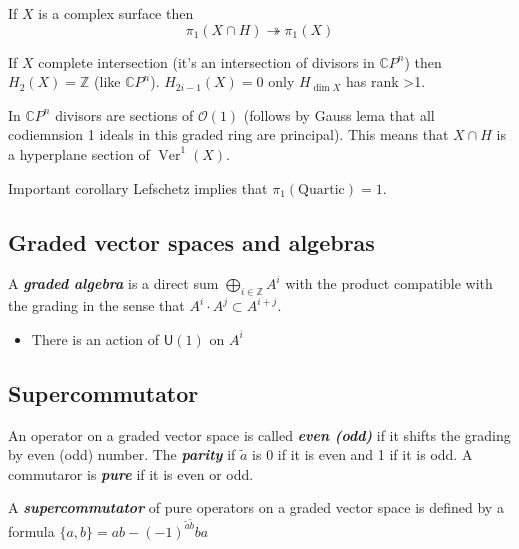\begin{coro}\leavevmode
If $X$ is a complex surface then
 \[\pi_{1}(X\cap H) \twoheadrightarrow \pi_{1}(X)\]
\end{coro}

\begin{coro}\leavevmode
	If $X$ complete intersection (it's an intersection of divisors in $\mathbb{C}P^{n}$) then $H_{2}(X) =\mathbb{Z}$ (like $\mathbb{C}P^{n}$). $H_{2i-1}(X)=0$ only $H_{\dim X}$ has rank >1.
\end{coro}

In $\mathbb{C}P^{n}$ divisors are sections of $\mathcal{O}(1)$ (follows by Gauss lema that all codiemnsion 1 ideals in this graded ring are principal). This means that $X\cap H$ is a hyperplane section of $ \operatorname{Ver}^1(X)$.

\begin{thing6}{Important corollary}\leavevmode
	Lefschetz implies that  $\pi_{1}(\text{Quartic} ) =1$.
\end{thing6}

\subsection{Graded vector spaces and algebras}

\begin{defn}\leavevmode
	A \textit{\textbf{graded algebra}} is a direct sum  $\bigoplus_{i \in\mathbb{Z}}A^i  $ with the product compatible with the grading in the sense that $A^i\cdot A^j\subset A^{i+j}$.
\end{defn}

\begin{itemize}
\item There is an action of $\mathsf{U}(1)$ on $A^i$
\end{itemize}

\subsection{Supercommutator}

\begin{defn}\leavevmode
	An operator on a graded vector space is called \textit{\textbf{even (odd)}} if it shifts the grading by even (odd) number. The  \textit{\textbf{parity}} if  $\tilde{a}$ is 0 if it is even and 1 if it is odd. A commutaror is \textit{\textbf{pure}} if it is even or odd.
\end{defn}

\begin{defn}\leavevmode
	A \textit{\textbf{supercommutator}} of pure operators on a graded vector space is defined by a formula $\{a,b\} =ab-(-1)^{\tilde{a}\tilde{b}}ba$
\end{defn}

